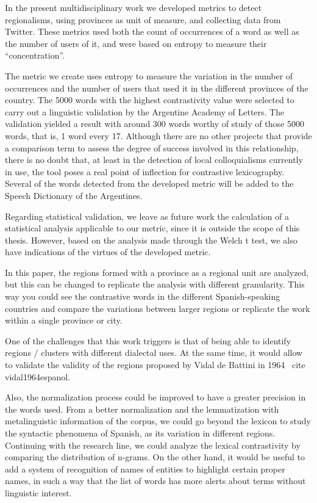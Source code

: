 In the present multidisciplinary work we developed metrics to detect regionalisms, using provinces as unit of measure, and collecting data from Twitter. These metrics used both the count of occurrences of a word as well as the number of users of it, and were based on entropy to measure their ``concentration''.


The metric we create uses entropy to measure the variation in the number of occurrences and the number of users that used it in the different provinces of the country. The 5000 words with the highest contrastivity value were selected to carry out a linguistic validation by the Argentine Academy of Letters. The validation yielded a result with around 300 words worthy of study of those 5000 words, that is, 1 word every 17.
Although there are no other projects that provide a comparison term to assess the degree of success involved in this relationship, there is no doubt that, at least in the detection of local colloquialisms currently in use, the tool poses a real point of inflection for contrastive lexicography.
Several of the words detected from the developed metric will be added to the Speech Dictionary of the Argentines.

Regarding statistical validation, we leave as future work the calculation of a statistical analysis applicable to our metric, since it is outside the scope of this thesis. However, based on the analysis made through the Welch t test, we also have indications of the virtues of the developed metric.

In this paper, the regions formed with a province as a regional unit are analyzed, but this can be changed to replicate the analysis with different granularity. This way you could see the contrastive words in the different Spanish-speaking countries and compare the variations between larger regions or replicate the work within a single province or city.

One of the challenges that this work triggers is that of being able to identify regions / clusters with different dialectal uses. At the same time, it would allow to validate the validity of the regions proposed by Vidal de Battini in 1964 \ cite {vidal1964espanol}.

Also, the normalization process could be improved to have a greater precision in the words used. From a better normalization and the lemmatization with metalinguistic information of the corpus, we could go beyond the lexicon to study the syntactic phenomena of Spanish, as its variation in different regions. Continuing with the research line, we could analyze the lexical contrastivity by comparing the distribution of n-grams. On the other hand, it would be useful to add a system of recognition of names of entities to highlight certain proper names, in such a way that the list of words has more alerts about terms without linguistic interest.

